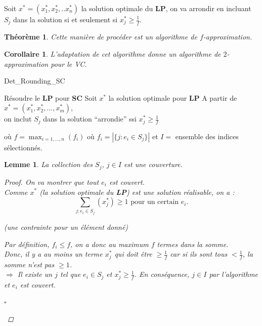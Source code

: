 \documentclass{article}
\newcommand{\titre}[1]{\textcolor{title}{#1}}
\newcommand{\cqfd}{\begin{flushright}$\square$\end{flushright}}
\newtheorem{corollaire}{Corollaire}[section]
\newtheorem{thm}{Th\'eor\`eme}[section]
\newtheorem{lemme}{Lemme}[section]
\newtheorem{proof}{Preuve}[section]
\begin{document}
\begin{sffamily}
Soit $x^* = (x_1^*, x_2^*, .. x_n^*)$ la solution optimale du \textbf{LP},
on va arrondir en incluant $S_j$ dans la solution si et seulement si
$x_j^* \geq \frac{1}{f}$.

\begin{thm}
Cette manière de procéder est un algorithme de $f$-\textit{approximation}.
\end{thm}
\begin{corollaire}
L'adaptation de cet algorithme donne un algorithme de $2$-approximation pour le
\titre{VC}.
\end{corollaire}

\vspace{5em}

\begin{algorithm}[h!]
\caption{Det\_Rounding\_SC}
\begin{algorithmic}[1]
\STATE Résoudre le \textbf{LP} pour \textbf{\titre{SC}}
\STATE Soit $x^*$ la solution optimale pour \textbf{LP}
\STATE A partir de $x^* = (x^*_1,x^*_2, \ldots, x^*_m)$,\\
on inclut $S_j$ dans la solution ``arrondie'' ssi $x^*_j \geq \frac{1}{f}$
\end{algorithmic}
\end{algorithm}

où $f = \max_{i=1,...,n} (f_i)$ où $f_i = |\{j:e_i \in S_j\}|$ et $I =$ ensemble
des indices sélectionnés.

\begin{lemme}
La collection des $S_j$, $j \in I$ est une couverture.
\begin{proof}
On va montrer que tout $e_i$ est couvert.\\
Comme $x^*$ \textit{(la solution optimale du \textbf{LP})} est une solution
réalisable, on a :
$$\sum_{j : e_i\in S_j} (x^*_j) \geq 1\text{ pour un certain } e_i.$$
\begin{center}\textit{(une contrainte pour un élément donné)}\end{center}
Par définition, $f_i \leq f$, on a donc au maximum $f$ termes dans la somme. \\
Donc, il y a au moins un terme $x^*_j$ qui doit être $\geq \frac{1}{f}$ car si
ils sont tous $<\frac{1}{f}$, la somme n'est pas $\geq 1$.\\
$\Rightarrow$ Il existe un $j$ tel que $e_i \in S_j$ et $x^*_j \geq \frac{1}{f}$.
En conséquence, $j \in I$ par l'algorithme et $e_i$ est couvert.
\cqfd
\end{proof}
\end{lemme}


\end{sffamily}
\end{document}
